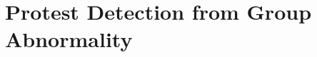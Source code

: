 \chapter{Protest Detection from Group Abnormality}

\begingroup
\newcommand{\score}{S}
\newcommand{\myalgo}{CoolAlgo}



%














\endgroup
